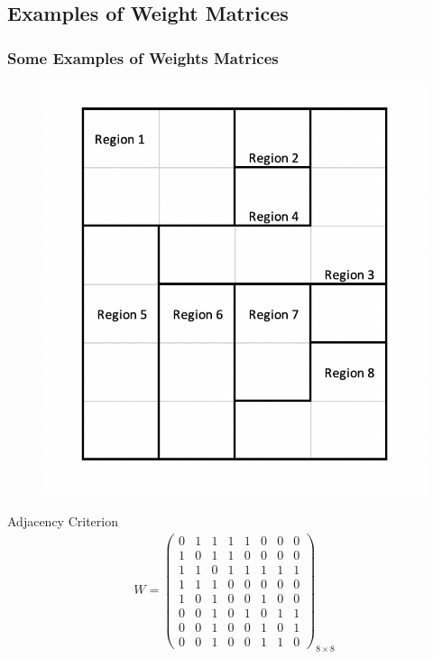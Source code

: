 \documentclass[
  shownotes,
  xcolor={svgnames},
  hyperref={colorlinks,citecolor=DarkBlue,linkcolor=DarkRed,urlcolor=DarkBlue}
  ]{beamer}
\begin{document}
\subsection{Examples of Weight Matrices}
\begin{frame}[fragile]
\frametitle{Some Examples of Weights Matrices}


\begin{minipage}[t]{0.53\linewidth}
  \begin{figure}[H] \centering
    \captionsetup{justification=centering}
    \includegraphics[scale=0.6]{figures/regions_example}
   \end{figure}
  
    \end{minipage}
    \hfill
\begin{minipage}[t]{0.43\linewidth}%
\scriptsize
Adjacency Criterion
\begin{align}
W=\left(\begin{array}{cccccccc}
0 & 1 & 1 & 1 & 1 & 0 & 0 & 0\\
1 & 0 & 1 & 1 & 0 & 0 & 0 & 0\\
1 & 1 & 0 & 1 & 1 & 1 & 1 & 1\\
1 & 1 & 1 & 0 & 0 & 0 & 0 & 0\\
1 & 0 & 1 & 0 & 0 & 1 & 0 & 0\\
0 & 0 & 1 & 0 & 1 & 0 & 1 & 1\\
0 & 0 & 1 & 0 & 0 & 1 & 0 & 1\\
0 & 0 & 1 & 0 & 0 & 1 & 1 & 0
\end{array}\right)_{8\times8} \nonumber
\end{align}
\end{minipage}

\end{frame}
\end{document}
